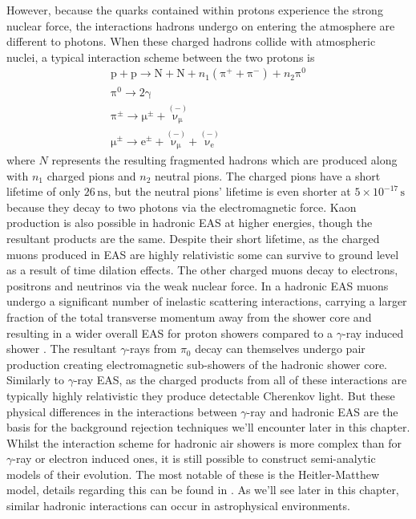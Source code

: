 However, because the quarks contained within protons experience the strong nuclear force, the   interactions hadrons undergo on entering the atmosphere are different to photons. When these charged hadrons collide with atmospheric nuclei, a typical interaction scheme between the two protons \cite{EAS} is
\begin{gather*}
\mathrm{p}+\mathrm{p}\rightarrow \mathrm{N}+\mathrm{N}+n_1 (\mathrm{\pi^+ + \pi^- })+n_2\mathrm{\pi^0} \\
\mathrm{\pi^0} \rightarrow \mathrm{2\gamma} \\
\mathrm{\mathrm{\pi^{\pm}}} \rightarrow \mathrm{\mu^{\pm}}+\mathrm{\overset{(-)}{\nu_{\mu}}}\\
\mathrm{\mu^{\pm}} \rightarrow \mathrm{e^{\pm}}+\mathrm{\overset{(-)}{\nu_{\mu}}}+\mathrm{\overset{(-)}{\nu_{e}}}
\end{gather*}
where $N$ represents the resulting fragmented hadrons which are produced along with $n_1$ charged pions and $n_2$ neutral pions. The charged pions have a short lifetime of only $\mathrm{26\,ns}$, but the neutral pions' lifetime is even shorter at $5 \times 10^{-17}\,\mathrm{s}$ because they decay to two photons via the electromagnetic force. Kaon production is also possible in hadronic EAS at higher energies, though the resultant products are the same. Despite their short lifetime, as the charged muons produced in EAS are highly relativistic some can survive to ground level as a result of time dilation effects. The other charged muons decay to electrons, positrons and neutrinos via the weak nuclear force. In a hadronic EAS muons undergo a significant number of inelastic scattering interactions, carrying a larger fraction of the total transverse momentum away from the shower core and resulting in a wider overall EAS for proton showers compared to a $\gamma$-ray induced shower \cite{tomthesis}.  The resultant $\gamma$-rays from $\pi_0$ decay can themselves undergo pair production creating electromagnetic sub-showers of the hadronic shower core. Similarly to $\gamma$-ray EAS, as the charged products from all of these interactions are typically highly relativistic they produce detectable Cherenkov light. But these physical differences in the interactions between $\gamma$-ray and hadronic EAS are the basis for the background rejection techniques we'll encounter later in this chapter. Whilst the interaction scheme for hadronic air showers is more complex than for $\gamma$-ray or electron induced ones, it is still possible to construct semi-analytic models of their evolution. The most notable of these is the Heitler-Matthew model, details regarding this can be found in \cite{heitler}. As we'll see later in this chapter, similar hadronic interactions can occur in astrophysical environments.
